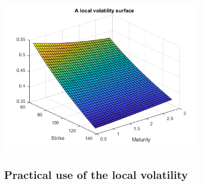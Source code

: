 \includegraphics [width=4in]{fig/ScriptM_02.png}


\subsection{Practical use of the local volatility}

